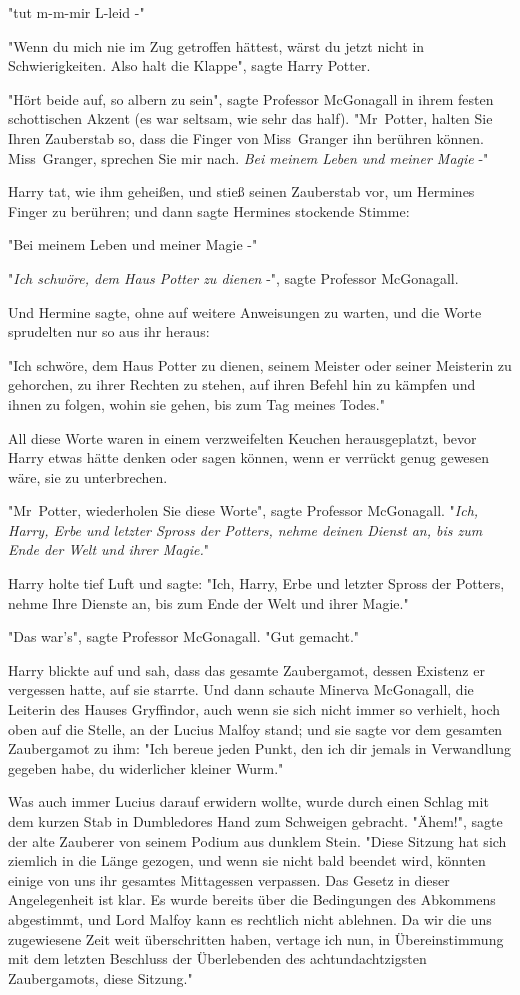 {"tut m-m-mir L-leid -"

"Wenn du mich nie im Zug getroffen hättest, wärst du jetzt nicht in Schwierigkeiten. Also halt die Klappe", sagte Harry Potter.

"Hört beide auf, so albern zu sein", sagte Professor McGonagall in ihrem festen schottischen Akzent (es war seltsam, wie sehr das half). "Mr~Potter, halten Sie Ihren Zauberstab so, dass die Finger von Miss~Granger ihn berühren können. Miss~Granger, sprechen Sie mir nach. \emph{Bei meinem Leben und meiner Magie} -"

Harry tat, wie ihm geheißen, und stieß seinen Zauberstab vor, um Hermines Finger zu berühren; und dann sagte Hermines stockende Stimme:

"Bei meinem Leben und meiner Magie -"

"\emph{Ich schwöre, dem Haus Potter zu dienen} -", sagte Professor McGonagall.

Und Hermine sagte, ohne auf weitere Anweisungen zu warten, und die Worte sprudelten nur so aus ihr heraus:

"Ich schwöre, dem Haus Potter zu dienen, seinem Meister oder seiner Meisterin zu gehorchen, zu ihrer Rechten zu stehen, auf ihren Befehl hin zu kämpfen und ihnen zu folgen, wohin sie gehen, bis zum Tag meines Todes."

All diese Worte waren in einem verzweifelten Keuchen herausgeplatzt, bevor Harry etwas hätte denken oder sagen können, wenn er verrückt genug gewesen wäre, sie zu unterbrechen.

"Mr~Potter, wiederholen Sie diese Worte", sagte Professor McGonagall. "\emph{Ich, Harry, Erbe und letzter Spross der Potters, nehme deinen Dienst an, bis zum Ende der Welt und ihrer Magie.}"

Harry holte tief Luft und sagte: "Ich, Harry, Erbe und letzter Spross der Potters, nehme Ihre Dienste an, bis zum Ende der Welt und ihrer Magie."

"Das war's", sagte Professor McGonagall. "Gut gemacht."

Harry blickte auf und sah, dass das gesamte Zaubergamot, dessen Existenz er vergessen hatte, auf sie starrte. Und dann schaute Minerva McGonagall, die Leiterin des Hauses Gryffindor, auch wenn sie sich nicht immer so verhielt, hoch oben auf die Stelle, an der Lucius Malfoy stand; und sie sagte vor dem gesamten Zaubergamot zu ihm: "Ich bereue jeden Punkt, den ich dir jemals in Verwandlung gegeben habe, du widerlicher kleiner Wurm."

Was auch immer Lucius darauf erwidern wollte, wurde durch einen Schlag mit dem kurzen Stab in Dumbledores Hand zum Schweigen gebracht. "Ähem!", sagte der alte Zauberer von seinem Podium aus dunklem Stein. "Diese Sitzung hat sich ziemlich in die Länge gezogen, und wenn sie nicht bald beendet wird, könnten einige von uns ihr gesamtes Mittagessen verpassen. Das Gesetz in dieser Angelegenheit ist klar. Es wurde bereits über die Bedingungen des Abkommens abgestimmt, und Lord Malfoy kann es rechtlich nicht ablehnen. Da wir die uns zugewiesene Zeit weit überschritten haben, vertage ich nun, in Übereinstimmung mit dem letzten Beschluss der Überlebenden des achtundachtzigsten Zaubergamots, diese Sitzung."

}
